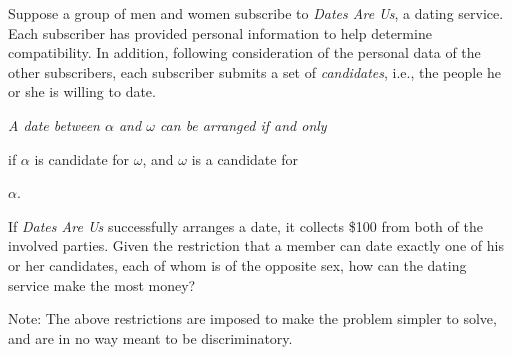 Suppose a group of men and women subscribe to {\em Dates Are Us}, a
dating service.  Each subscriber has provided personal information to
help determine compatibility.  In addition, following consideration of
the personal data of the other subscribers, each subscriber submits a set
of {\em candidates}, i.e., the people he or she is willing to date. 

{\it A date between $\alpha$ and $\omega$ can be arranged if and only

if $\alpha$ is candidate for $\omega$, and $\omega$ is a candidate for

$\alpha$.}

If {\em Dates Are Us} successfully arranges a date, it collects \$100
from both of the involved parties.  Given the restriction that a
member can date exactly one of his or her candidates, each of whom is
of the opposite sex, how can the dating service make the most money?

Note: The above restrictions are imposed to make the problem simpler
to solve, and are in no way meant to be discriminatory.

